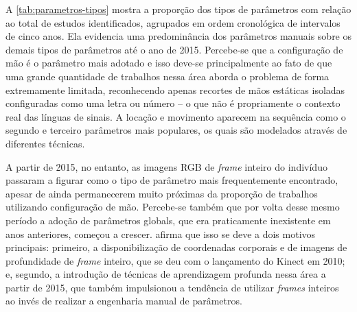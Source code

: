 A \autoref{tab:parametros-tipos} mostra a proporção dos tipos de parâmetros com relação ao total de estudos identificados, agrupados em ordem cronológica de intervalos de cinco anos. 
Ela evidencia uma predominância dos parâmetros manuais sobre os demais tipos de parâmetros até o ano de 2015. Percebe-se que a configuração de mão é o parâmetro mais adotado e isso deve-se principalmente ao fato de que uma grande quantidade de trabalhos nessa área aborda o problema de forma extremamente limitada, reconhecendo apenas recortes de mãos estáticas isoladas configuradas como uma letra ou número -- o que não é propriamente o contexto real das línguas de sinais. A locação e movimento aparecem na sequência como o segundo e terceiro parâmetros mais populares, os quais são modelados através de diferentes técnicas.



A partir de 2015, no entanto, as imagens RGB de \textit{frame} inteiro do indivíduo passaram a figurar como o tipo de parâmetro mais frequentemente encontrado, apesar de ainda permanecerem muito próximas da proporção de trabalhos utilizando configuração de mão. Percebe-se também que por volta desse mesmo período a adoção de parâmetros globals, que era praticamente inexistente em anos anteriores, começou a crescer.  afirma que isso se deve a dois motivos principais: primeiro, a disponibilização de coordenadas corporais e de imagens de profundidade de \textit{frame} inteiro, que se deu com o lançamento do Kinect em 2010; e, segundo, a introdução de técnicas de aprendizagem profunda nessa área a partir de 2015, que também impulsionou a tendência de utilizar \textit{frames} inteiros ao invés de realizar a engenharia manual de parâmetros.



